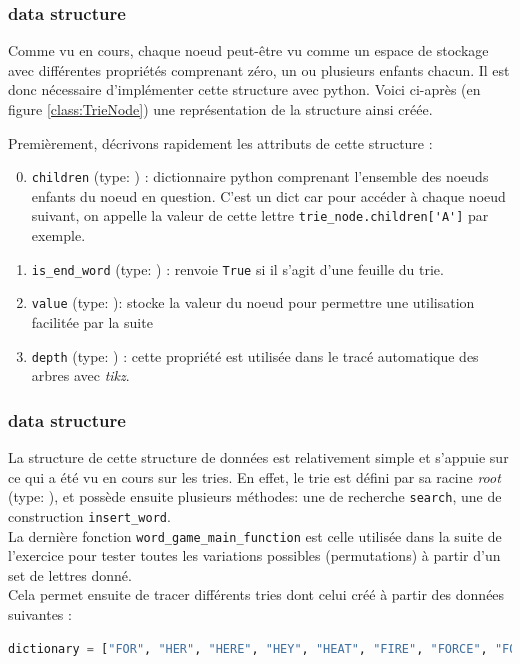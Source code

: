 \documentclass[10pt,a4paper,hidelinks]{article}
\begin{document}
\subsubsection{ data structure}

Comme vu en cours, chaque noeud peut-être vu comme un espace de stockage avec différentes propriétés comprenant zéro, un ou plusieurs enfants chacun. Il est donc nécessaire d'implémenter cette structure avec python. Voici ci-après (en figure \ref{class:TrieNode}) une représentation de la structure ainsi créée.

Premièrement, décrivons rapidement les attributs de cette structure :
\begin{enumerate}
    \setcounter{enumi}{-1}
    \item \verb|children| (type: ) : dictionnaire python comprenant l'ensemble des noeuds enfants du noeud en question. C'est un dict car pour accéder à chaque noeud suivant, on appelle la valeur de cette lettre \verb|trie_node.children['A']| par exemple.
    \item \verb|is_end_word| (type: ) : renvoie \verb|True| si il s'agit d'une feuille du trie.
    \item \verb|value| (type: ): stocke la valeur du noeud pour permettre une utilisation facilitée par la suite
    \item \verb|depth| (type: ) : cette propriété est utilisée dans le tracé automatique des arbres avec \textit{tikz}.
\end{enumerate}

\subsubsection{ data structure}

La structure de cette structure de données est relativement simple et s'appuie sur ce qui a été vu en cours sur les tries. En effet, le trie est défini par sa racine \textit{root} (type: ), et possède ensuite plusieurs méthodes: une de recherche \verb|search|, une de construction \verb|insert_word|.\\
La dernière fonction \verb|word_game_main_function| est celle utilisée dans la suite de l'exercice pour tester toutes les variations possibles (permutations) à partir d'un set de lettres donné.\\

Cela permet ensuite de tracer différents tries dont celui créé à partir des données suivantes :
\begin{lstlisting}[language=Python, caption=Sample data to create trie]
dictionary = ["FOR", "HER", "HERE", "HEY", "HEAT", "FIRE", "FORCE", "FORWARD", "FORWARDER", "FIRM", "FIRSTLY", "FIRSTS", "FIREWORK", "HEIGHTY", "HEIGHTEEN", "FIREWALL"]
\end{lstlisting}
\small{}
\end{document}
